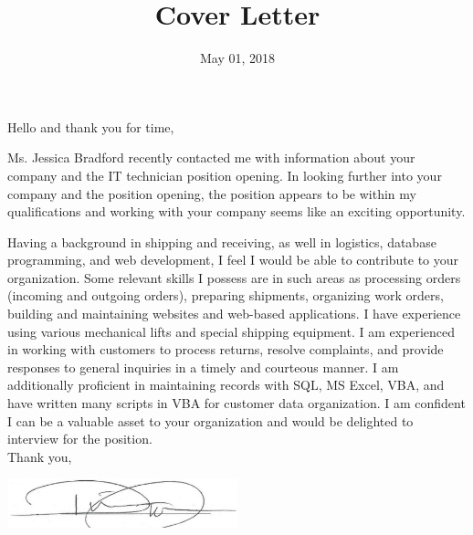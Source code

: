 \documentclass[11pt,a4paper,sans]{moderncv}        %
\title{Cover Letter}                               %
\begin{document}
\date{May 01, 2018}
\opening{Hello and thank you for time,}
\closing{}
\makelettertitle


Ms. Jessica Bradford recently contacted me with information about your company and the IT technician position opening. In looking further into your company and the position opening, the position appears to be within my qualifications and working with your company seems like an exciting opportunity.

Having a background in shipping and receiving, as well in logistics, database
programming, and web development, I feel I would be able to contribute to your organization.
Some relevant skills I possess are in such areas as processing orders (incoming and
outgoing orders), preparing shipments, organizing work orders, building and maintaining websites and web-based applications. I have experience using various mechanical lifts and special shipping equipment. I am experienced in working with customers to process returns, resolve complaints, and provide responses to general inquiries in a timely and courteous manner. I am additionally proficient in maintaining records with SQL, MS Excel, VBA,
and have written many scripts in VBA for customer data organization.
\newline
\newline
I am confident I can be a valuable asset to your organization and would be delighted to
interview for the position.\newline \newline \newline \\ 


Thank you,

\begin{minipage}{\textwidth}
  \includegraphics[width=0.5\textwidth]{sig.png} \\
\end{minipage}
\makeletterclosing
\end{document}
